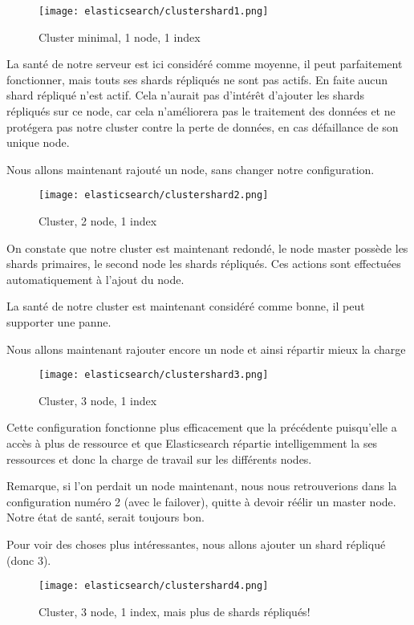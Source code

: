 \begin{figure}[H]
\center
\texttt{[image: elasticsearch/clustershard1.png]}
\label{fig:clustershard1}
\caption{Cluster minimal, 1 node, 1 index}
\end{figure}

La santé de notre serveur est ici considéré comme moyenne, il peut parfaitement 
fonctionner, mais touts ses shards répliqués ne sont pas  actifs. En faite aucun 
shard répliqué n'est actif. Cela n'aurait pas d'intérêt d'ajouter les shards répliqués
sur ce node, car cela n'améliorera pas le traitement des données et ne protégera pas
notre cluster contre la perte de données, en cas défaillance de son unique node.

Nous allons maintenant rajouté un node, sans changer notre configuration.

\begin{figure}[H]
\center
\texttt{[image: elasticsearch/clustershard2.png]}
\label{fig:clustershard2}
\caption{Cluster, 2 node, 1 index}
\end{figure}

On constate que notre cluster est maintenant redondé, le node master possède les 
shards primaires, le second node les shards répliqués. Ces actions sont effectuées
automatiquement à l'ajout du node.

La santé de notre cluster est maintenant considéré comme bonne, il peut supporter 
une panne.

Nous allons maintenant rajouter encore un node et ainsi répartir mieux la charge

\begin{figure}[H]
\center
\texttt{[image: elasticsearch/clustershard3.png]}
\label{fig:clustershard3}
\caption{Cluster, 3 node, 1 index}
\end{figure}

Cette configuration fonctionne plus efficacement que la précédente puisqu'elle a 
accès à plus de ressource et que Elasticsearch répartie intelligemment la ses ressources
et donc la charge de travail sur les différents nodes.

Remarque, si l'on perdait un node maintenant, nous nous retrouverions dans la configuration
numéro 2 (avec le failover), quitte à devoir réélir un master node. Notre état de santé,
serait toujours bon.

Pour voir des choses plus intéressantes, nous allons ajouter un shard répliqué (donc 3).

\begin{figure}[H]
\center
\texttt{[image: elasticsearch/clustershard4.png]}
\label{fig:clustershard4}
\caption{Cluster, 3 node, 1 index, mais plus de shards répliqués!}
\end{figure}


